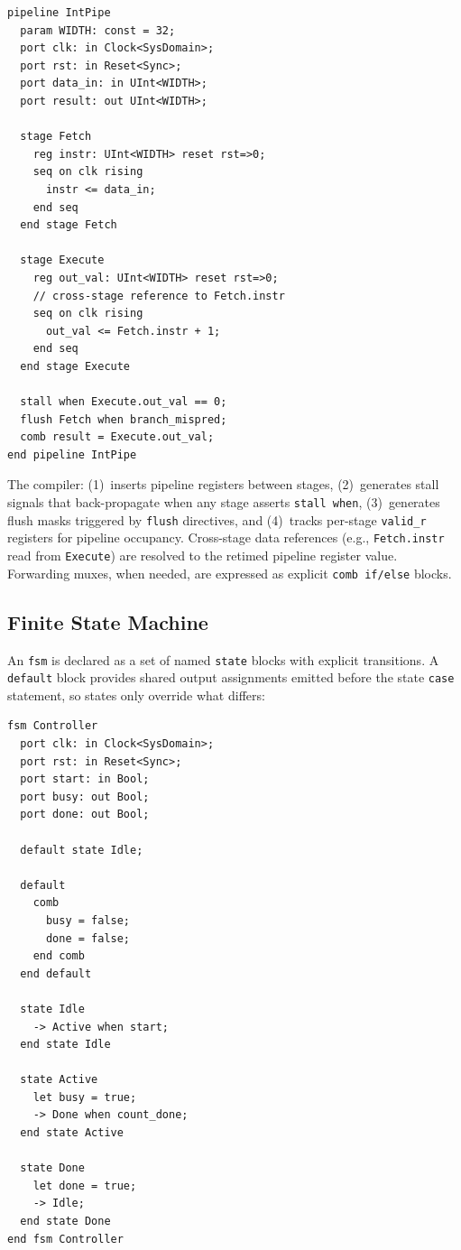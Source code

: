 \documentclass[11pt,twocolumn]{article}
\begin{document}
\begin{lstlisting}[language=Arch,caption={Pipeline with forwarding},label={lst:pipe}]
pipeline IntPipe
  param WIDTH: const = 32;
  port clk: in Clock<SysDomain>;
  port rst: in Reset<Sync>;
  port data_in: in UInt<WIDTH>;
  port result: out UInt<WIDTH>;

  stage Fetch
    reg instr: UInt<WIDTH> reset rst=>0;
    seq on clk rising
      instr <= data_in;
    end seq
  end stage Fetch

  stage Execute
    reg out_val: UInt<WIDTH> reset rst=>0;
    // cross-stage reference to Fetch.instr
    seq on clk rising
      out_val <= Fetch.instr + 1;
    end seq
  end stage Execute

  stall when Execute.out_val == 0;
  flush Fetch when branch_mispred;
  comb result = Execute.out_val;
end pipeline IntPipe
\end{lstlisting}

The compiler:
(1)~inserts pipeline registers between stages,
(2)~generates stall signals that back-propagate when any stage asserts \texttt{stall when},
(3)~generates flush masks triggered by \texttt{flush} directives, and
(4)~tracks per-stage \texttt{valid\_r} registers for pipeline occupancy.
Cross-stage data references (e.g., \texttt{Fetch.instr} read from \texttt{Execute}) are resolved to the retimed pipeline register value. Forwarding muxes, when needed, are expressed as explicit \texttt{comb if/else} blocks.

\subsection{Finite State Machine}

An \texttt{fsm} is declared as a set of named \texttt{state} blocks with explicit transitions. A \texttt{default} block provides shared output assignments emitted before the state \texttt{case} statement, so states only override what differs:

\begin{lstlisting}[language=Arch,caption={FSM with default block and transitions},label={lst:fsm}]
fsm Controller
  port clk: in Clock<SysDomain>;
  port rst: in Reset<Sync>;
  port start: in Bool;
  port busy: out Bool;
  port done: out Bool;

  default state Idle;

  default
    comb
      busy = false;
      done = false;
    end comb
  end default

  state Idle
    -> Active when start;
  end state Idle

  state Active
    let busy = true;
    -> Done when count_done;
  end state Active

  state Done
    let done = true;
    -> Idle;
  end state Done
end fsm Controller
\end{lstlisting}
\end{document}
